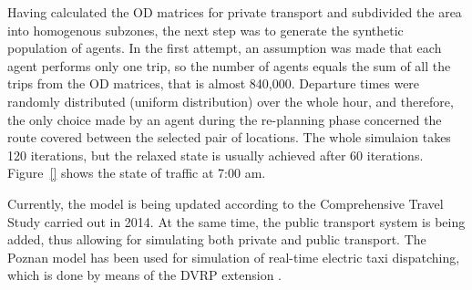
Having calculated the OD matrices for private transport and subdivided the area into homogenous subzones, the next step was to generate the synthetic population of agents. In the first attempt, an assumption was made that each agent performs only one trip, so the number of agents equals the sum of all the trips from the OD matrices, that is almost 840,000. Departure times were randomly distributed (uniform distribution) over the whole hour, and therefore, the only choice made by an agent during the re-planning phase concerned the route covered between the selected pair of locations. The whole simulaion takes 120 iterations, but the relaxed state is usually achieved after 60 iterations. Figure~\ref{} shows the state of traffic at 7:00 am.


Currently, the model is being updated according to the Comprehensive Travel Study carried out in 2014. At the same time, the public transport system is being added, thus allowing for simulating both private and public transport. The Poznan model has been used for simulation of real-time electric taxi dispatching, which is done by means of the DVRP extension .

